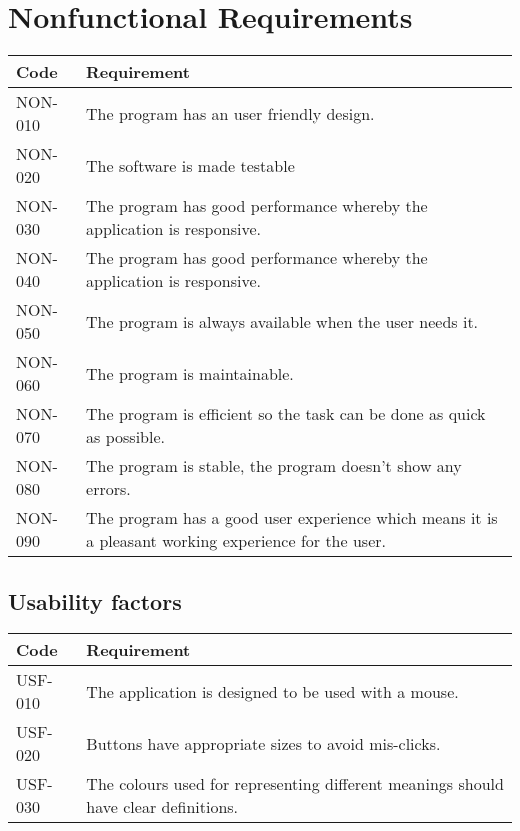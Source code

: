\chapter{Nonfunctional Requirements}
\begin{tabularx}{\textwidth}{|p{2cm}X|}\hline
Code & Requirement \\\hline
NON-010 & The program has an user friendly design.\\\hline
NON-020 & The software is made testable\\\hline
NON-030 & The program has good performance whereby the application is responsive.\\\hline
NON-040 & The program has good performance whereby the application is responsive.\\\hline
NON-050 & The program is always available when the user needs it.\\\hline
NON-060 & The program is maintainable.\\\hline
NON-070 & The program is efficient so the task can be done as quick as possible.\\\hline
NON-080 & The program is stable, the program doesn't show any errors.\\\hline
NON-090 & The program has a good user experience which means it is a pleasant working experience for the user.\\\hline
\end{tabularx}

\section{Usability factors}
\begin{tabularx}{\textwidth}{|p{2cm}X|}\hline
Code & Requirement \\\hline
USF-010 & The application is designed to be used with a mouse.\\\hline
USF-020 & Buttons have appropriate sizes to avoid mis-clicks.\\\hline
USF-030 & The colours used for representing different meanings should have clear definitions.\\\hline
\end{tabularx}
